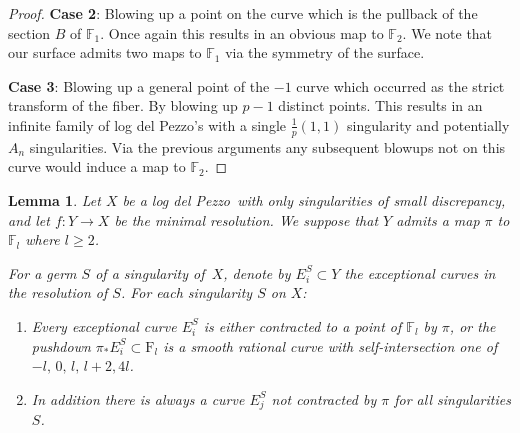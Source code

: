 \documentclass[12pt,a4paper]{book}      %
\newtheorem{lem}[thm]{Lemma}
\newcommand{\ldp}{log del Pezzo}
\newcommand{\mb}[1]{\mathbb{#1}}
\newcommand{\minres}{minimal resolution}
\newcommand{\F}{\mathrm{F}}
\begin{document}
\begin{proof}
\textbf{Case 2}: Blowing up a point on the curve which is the pullback of the section $B$ of $\mb{F}_1$. Once again this results in an obvious map to $\mb{F}_2$. We note that our surface admits two maps to $\mb{F}_1$ via the symmetry of the surface.


\textbf{Case 3}:
Blowing up a general point of the $-1 $ curve which occurred as the strict transform of the fiber. By blowing up $p-1$ distinct points. This results in an infinite family of \ldp's with a single $\frac{1}{p}(1,1)$ singularity and potentially $A_n$ singularities.
Via the previous arguments any subsequent blowups not on this curve would induce a map to $\mb{F}_2$.
\end{proof}


\begin{lem}\label{HSlem}
Let $X$ be a \ldp\ with only singularities of small discrepancy, and
let $f \colon Y \rightarrow X$ be the \minres. We suppose that $Y$ admits a map $\pi$ to $\mb{F}_l$ where $l \geq 2$.

For a germ $S$ of a singularity of~$X$, denote by
$E_i^S \subset Y$ the exceptional curves in the resolution of $S$.
For each singularity $S$ on $X$:
\begin{enumerate}
\item
Every exceptional curve $E_i^S$ is either contracted to a point of $\mb{F}_l$ by $\pi$,
or the pushdown
$\pi_* E_i^S\subset\F_l$ is a smooth rational curve with self-intersection one of $-l, \,0, \, l, \, l+2, 4l $.
\item
In addition there is always a curve $E_j^S$ not contracted by $\pi$ for all singularities $S$.
\end{enumerate}

\end{lem}
\end{document}
